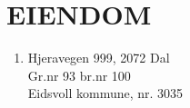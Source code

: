 \section{EIENDOM}


    \begin{enumerate}


        \item Hjeravegen 999, 2072 Dal\\Gr.nr 93 br.nr 100\\Eidsvoll kommune, nr. 3035

    \end{enumerate}
